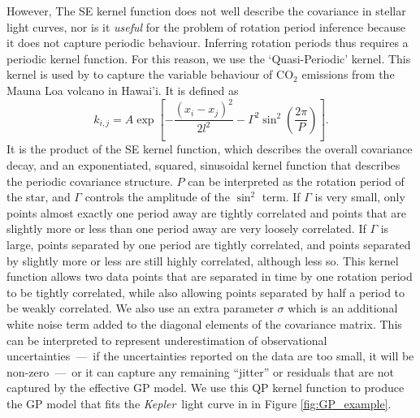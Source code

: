\documentclass[useAMS, usenatbib, preprint, 12pt]{aastex}
\newcommand{\Kepler}{{\it Kepler}}
\begin{document}
However, The SE kernel function does not well describe the covariance
in stellar light curves, nor is it {\it useful} for the problem of
rotation period inference because it does not capture periodic behaviour.
Inferring rotation periods thus requires a periodic kernel
function.  For this reason, we use the `Quasi-Periodic' kernel.
This kernel is used by \citet{Rasmussen2005} to capture the variable behaviour
of CO$_2$ emissions from the Mauna Loa volcano in Hawai'i.
It is defined as
\begin{equation}
k_{i,j} = A \exp \left[-\frac{(x_i - x_j)^2}{2l^2} -
\Gamma^2 \sin^2\left(\frac{2\pi}{P}\right) \right].
\end{equation}
\label{eq:QP}
It is the product of the SE kernel function, which describes the overall
covariance decay, and an exponentiated, squared, sinusoidal kernel function
that describes the periodic covariance structure.
$P$ can be interpreted as the rotation period of the star, and $\Gamma$
controls the amplitude of the $\sin^2$ term.
If $\Gamma$ is very small, only points almost exactly one period away are
tightly correlated and points that are slightly more or less than one period
away are very loosely correlated.
If $\Gamma$ is large, points separated by one period are tightly
correlated, and points separated by slightly more or less are still highly
correlated, although less so.
This kernel function allows two data points that are separated in time by one
rotation period to be tightly correlated, while also allowing
points separated by half a period to be weakly correlated.
We also use an extra parameter $\sigma$ which is an additional white noise
term added to the diagonal elements of the covariance matrix.
This can be interpreted to represent underestimation of observational
uncertainties~---~if the uncertainties reported on the data are too small, it
will be non-zero~---~or it can capture any remaining ``jitter'' or residuals
that are not captured by the effective GP model.
We use this QP kernel function to produce the GP model
that fits the \Kepler\ light curve in in Figure \ref{fig:GP_example}.
\end{document}

